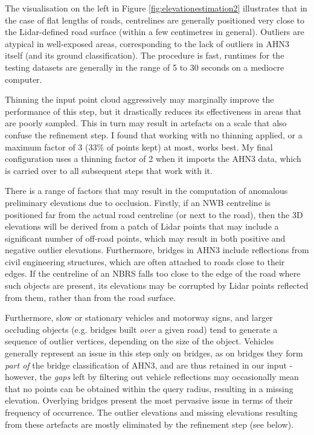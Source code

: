The visualisation on the left in Figure \ref{fig:elevationestimation2} illustrates that in the case of flat lengths of roads, centrelines are generally positioned very close to the Lidar-defined road surface (within a few centimetres in general). Outliers are atypical in well-exposed areas, corresponding to the lack of outliers in AHN3 itself (and its ground classification). The procedure is fast, runtimes for the testing datasets are generally in the range of 5 to 30 seconds on a mediocre computer.

Thinning the input point cloud aggressively may marginally improve the performance of this step, but it drastically reduces its effectiveness in areas that are poorly sampled. This in turn may result in artefacts on a scale that also confuse the refinement step. I found that working with no thinning applied, or a maximum factor of 3 (33\% of points kept) at most, works best. My final configuration uses a thinning factor of 2 when it imports the AHN3 data, which is carried over to all subsequent steps that work with it.

There is a range of factors that may result in the computation of anomalous preliminary elevations due to occlusion. Firstly, if an NWB centreline is positioned far from the actual road centreline (or next to the road), then the 3D elevations will be derived from a patch of Lidar points that may include a significant number of off-road points, which may result in both positive and negative outlier elevations. Furthermore, bridges in AHN3 include reflections from civil engineering structures, which are often attached to roads close to their edges. If the centreline of an NBRS falls too close to the edge of the road where such objects are present, its elevations may be corrupted by Lidar points reflected from them, rather than from the road surface.

Furthermore, slow or stationary vehicles and motorway signs, and larger occluding objects (e.g. bridges built \textit{over} a given road) tend to generate a sequence of outlier vertices, depending on the size of the object. Vehicles generally represent an issue in this step only on bridges, as on bridges they form \textit{part of} the bridge classification of AHN3, and are thus retained in our input - however, the \textit{gaps} left by filtering out vehicle reflections may occasionally mean that no points can be obtained within the query radius, resulting in a missing elevation. Overlying bridges present the most pervasive issue in terms of their frequency of occurrence. The outlier elevations and missing elevations resulting from these artefacts are mostly eliminated by the refinement step (see below).

